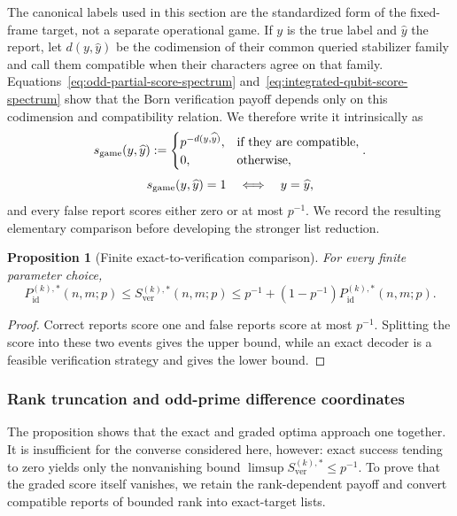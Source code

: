 \documentclass[11pt]{article}
\newcommand{\1}{\mathbf 1}
\theoremstyle{plain}
\newtheorem{proposition}[theorem]{Proposition}
\theoremstyle{definition}
\theoremstyle{remark}
\begin{document}
The canonical labels used in this section are the standardized form of the
fixed-frame target, not a separate operational game.  If $y$ is the true label
and $\widehat y$ the report, let $d(y,\widehat y)$ be the codimension of their
common queried stabilizer family and call them compatible when their characters
agree on that family.  Equations~\eqref{eq:odd-partial-score-spectrum}
and~\eqref{eq:integrated-qubit-score-spectrum} show that the Born
verification payoff depends only on this codimension and compatibility
relation.  We therefore write it intrinsically as
\begin{equation}
 s_{\rm game}(y,\widehat y):=
 \begin{cases}
 p^{-d(y,\widehat y)},&\text{if they are compatible},\\
 0,&\text{otherwise},
 \end{cases}.
 \label{eq:main-results-graded-payoff}
\end{equation}
\begin{equation}
 s_{\rm game}(y,\widehat y)=1\quad\Longleftrightarrow\quad y=\widehat y,
 \label{eq:main-results-score-one-exactness}
\end{equation}
and every false report scores either zero or at most $p^{-1}$.  We record the
resulting elementary comparison before developing the stronger list reduction.
\begin{proposition}[Finite exact-to-verification comparison]
\label{prop:prob-one-equivalence}
For every finite parameter choice,
\begin{equation}
 P_{\mathrm{id}}^{(k),*}(n,m;p)
 \le S_{\mathrm{ver}}^{(k),*}(n,m;p)
 \le p^{-1}+(1-p^{-1})P_{\mathrm{id}}^{(k),*}(n,m;p).
 \label{eq:score-sandwich}
\end{equation}
\end{proposition}
\begin{proof}
Correct reports score one and false reports score at most $p^{-1}$.  Splitting
the score into these two events gives the upper bound, while an exact decoder
is a feasible verification strategy and gives the lower bound.
\end{proof}

\subsubsection{Rank truncation and odd-prime difference coordinates}
\label{subsubsec:graded-rank-truncation-odd}
\label{subsec:rank-truncated-graded-to-exact}

The proposition shows that the exact and graded optima approach one together.  
It is insufficient for the converse considered here, however: exact success  
tending to zero yields only the nonvanishing bound  
$\limsup S_{\mathrm{ver}}^{(k),*}\le p^{-1}$.  To prove that the graded score  
itself vanishes, we retain the rank-dependent payoff and convert compatible  
reports of bounded rank into exact-target lists.  
\end{document}
